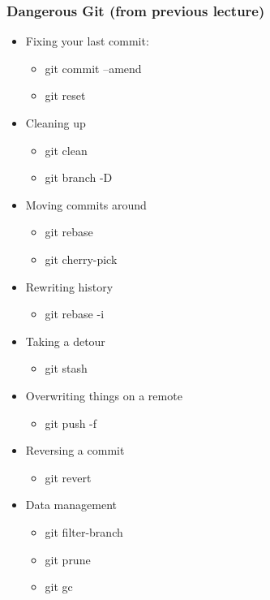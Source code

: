 \documentclass{beamer}
\begin{document}
\begin{frame}[fragile]
\frametitle{Dangerous Git (from previous lecture)}
\begin{itemize}
\item Fixing your last commit:
\begin{itemize}
\item git commit --amend
\item git reset
\end{itemize}
\item Cleaning up
\begin{itemize}
\item git clean
\item git branch -D
\end{itemize}
\item Moving commits around
\begin{itemize}
\item git rebase
\item git cherry-pick
\end{itemize}
\item Rewriting history
\begin{itemize}
\item git rebase -i
\end{itemize}
\end{itemize}
\end{frame}

\begin{frame}[fragile]
\begin{itemize}
\item Taking a detour
\begin{itemize}
\item git stash
\end{itemize}
\item Overwriting things on a remote
\begin{itemize}
\item git push -f
\end{itemize}
\item Reversing a commit
\begin{itemize}
\item git revert
\end{itemize}
\item Data management
\begin{itemize}
\item git filter-branch
\item git prune
\item git gc
\end{itemize}
\end{itemize}
\end{frame}
\end{document}
